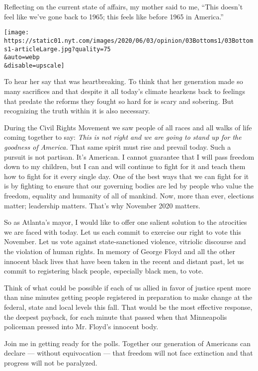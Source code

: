 Reflecting on the current state of affairs, my mother said to me, ``This
doesn't feel like we've gone back to 1965; this feels like before 1965
in America.''

\texttt{[image: https://static01.nyt.com/images/2020/06/03/opinion/03Bottoms1/03Bottoms1-articleLarge.jpg?quality=75\\\&auto=webp\\\&disable=upscale]}

To hear her say that was heartbreaking. To think that her generation
made so many sacrifices and that despite it all today's climate hearkens
back to feelings that predate the reforms they fought so hard for is
scary and sobering. But recognizing the truth within it is also
necessary.

During the Civil Rights Movement we saw people of all races and all
walks of life coming together to say: \emph{This is not right and we are
going to stand up for the goodness of America.} That same spirit must
rise and prevail today. Such a pursuit is not partisan. It's American. I
cannot guarantee that I will pass freedom down to my children, but I can
and will continue to fight for it and teach them how to fight for it
every single day. One of the best ways that we can fight for it is by
fighting to ensure that our governing bodies are led by people who value
the freedom, equality and humanity of all of mankind. Now, more than
ever, elections matter; leadership matters. That's why November 2020
matters.

So as Atlanta's mayor, I would like to offer one salient solution to the
atrocities we are faced with today. Let us each commit to exercise our
right to vote this November. Let us vote against state-sanctioned
violence, vitriolic discourse and the violation of human rights. In
memory of George Floyd and all the other innocent black lives that have
been taken in the recent and distant past, let us commit to registering
black people, especially black men, to vote.

Think of what could be possible if each of us allied in favor of justice
spent more than nine minutes getting people registered in preparation to
make change at the federal, state and local levels this fall. That would
be the most effective response, the deepest payback, for each minute
that passed when that Minneapolis policeman pressed into Mr. Floyd's
innocent body.

Join me in getting ready for the polls. Together our generation of
Americans can declare --- without equivocation --- that freedom will not
face extinction and that progress will not be paralyzed.

